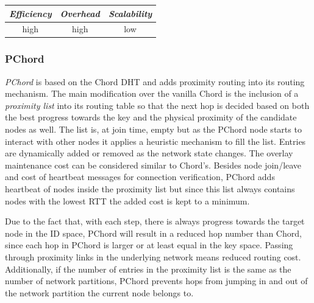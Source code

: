 \begin{center}
\begin{tabular}{ccc}
\emph{Efficiency} & \emph{Overhead} & \emph{Scalability} \\
\hline
high &
high &
low
\end{tabular}
\end{center}

\subsubsection{PChord}
\emph{PChord}\cite{HLYW2005} is based on the Chord DHT and adds
proximity routing into its routing mechanism. The main modification over the
vanilla Chord is the inclusion of a \emph{proximity list} into its routing table
so that the next hop is decided based on both the best progress
towards the key and the physical proximity of the candidate nodes as well.
The list is, at join time, empty but as the PChord node starts to interact with
other nodes it applies a heuristic mechanism to fill the list. Entries are
dynamically added or removed as the network state changes. The overlay
maintenance cost can be considered similar to Chord's. Besides node join/leave
and cost of heartbeat messages for connection verification, PChord adds
heartbeat of nodes inside the proximity list but since this list always contains
nodes with the lowest RTT the added cost is kept to a minimum.

Due to the fact that, with each step, there is always progress towards the
target node in the ID space, PChord will result in a reduced hop number than
Chord, since each hop in PChord is larger or at least equal in the key space.
Passing through proximity links in the underlying network means reduced routing
cost. Additionally, if the number of entries in the proximity list is the same
as the number of network partitions, PChord prevents hops from jumping in and
out of the network partition the current node belongs to.

